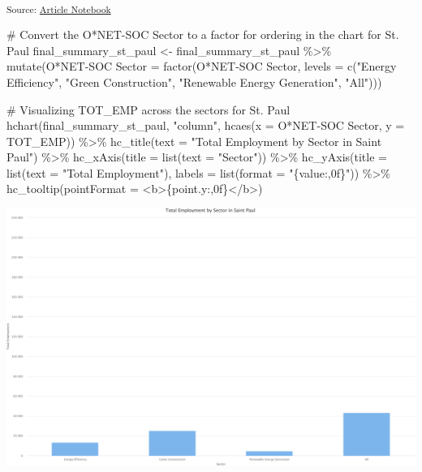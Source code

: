 \documentclass[
  letterpaper,
  DIV=11,
  numbers=noendperiod]{scrartcl}
\newenvironment{Shaded}{\begin{snugshade}}{\end{snugshade}}
\newcommand{\AttributeTok}[1]{\textcolor[rgb]{0.40,0.45,0.13}{#1}}
\newcommand{\CommentTok}[1]{\textcolor[rgb]{0.37,0.37,0.37}{#1}}
\newcommand{\FunctionTok}[1]{\textcolor[rgb]{0.28,0.35,0.67}{#1}}
\newcommand{\NormalTok}[1]{\textcolor[rgb]{0.00,0.23,0.31}{#1}}
\newcommand{\OtherTok}[1]{\textcolor[rgb]{0.00,0.23,0.31}{#1}}
\newcommand{\SpecialCharTok}[1]{\textcolor[rgb]{0.37,0.37,0.37}{#1}}
\newcommand{\StringTok}[1]{\textcolor[rgb]{0.13,0.47,0.30}{#1}}
\begin{document}
\textsubscript{Source:
\href{https://beeckcenter.github.io/climate-equity-workforce/index-preview.html}{Article
Notebook}}

\begin{Shaded}
\begin{Highlighting}[]
\CommentTok{\# Convert the O*NET{-}SOC Sector to a factor for ordering in the chart for St. Paul}
\NormalTok{final\_summary\_st\_paul }\OtherTok{\textless{}{-}}\NormalTok{ final\_summary\_st\_paul }\SpecialCharTok{\%\textgreater{}\%}
  \FunctionTok{mutate}\NormalTok{(}\StringTok{\textasciigrave{}}\AttributeTok{O*NET{-}SOC Sector}\StringTok{\textasciigrave{}} \OtherTok{=} \FunctionTok{factor}\NormalTok{(}\StringTok{\textasciigrave{}}\AttributeTok{O*NET{-}SOC Sector}\StringTok{\textasciigrave{}}\NormalTok{, }\AttributeTok{levels =} \FunctionTok{c}\NormalTok{(}\StringTok{"Energy Efficiency"}\NormalTok{, }\StringTok{"Green Construction"}\NormalTok{, }\StringTok{"Renewable Energy Generation"}\NormalTok{, }\StringTok{"All"}\NormalTok{)))}

\CommentTok{\# Visualizing TOT\_EMP across the sectors for St. Paul}
\FunctionTok{hchart}\NormalTok{(final\_summary\_st\_paul, }\StringTok{"column"}\NormalTok{, }\FunctionTok{hcaes}\NormalTok{(}\AttributeTok{x =} \StringTok{\textasciigrave{}}\AttributeTok{O*NET{-}SOC Sector}\StringTok{\textasciigrave{}}\NormalTok{, }\AttributeTok{y =}\NormalTok{ TOT\_EMP)) }\SpecialCharTok{\%\textgreater{}\%}
  \FunctionTok{hc\_title}\NormalTok{(}\AttributeTok{text =} \StringTok{"Total Employment by Sector in Saint Paul"}\NormalTok{) }\SpecialCharTok{\%\textgreater{}\%}
  \FunctionTok{hc\_xAxis}\NormalTok{(}\AttributeTok{title =} \FunctionTok{list}\NormalTok{(}\AttributeTok{text =} \StringTok{"Sector"}\NormalTok{)) }\SpecialCharTok{\%\textgreater{}\%}
  \FunctionTok{hc\_yAxis}\NormalTok{(}\AttributeTok{title =} \FunctionTok{list}\NormalTok{(}\AttributeTok{text =} \StringTok{"Total Employment"}\NormalTok{), }\AttributeTok{labels =} \FunctionTok{list}\NormalTok{(}\AttributeTok{format =} \StringTok{"\{value:,0f\}"}\NormalTok{)) }\SpecialCharTok{\%\textgreater{}\%}
  \FunctionTok{hc\_tooltip}\NormalTok{(}\AttributeTok{pointFormat =} \StringTok{\textquotesingle{}\textless{}b\textgreater{}\{point.y:,0f\}\textless{}/b\textgreater{}\textquotesingle{}}\NormalTok{)}
\end{Highlighting}
\end{Shaded}

\includegraphics{index_files/figure-pdf/unnamed-chunk-21-1.pdf}
\end{document}
